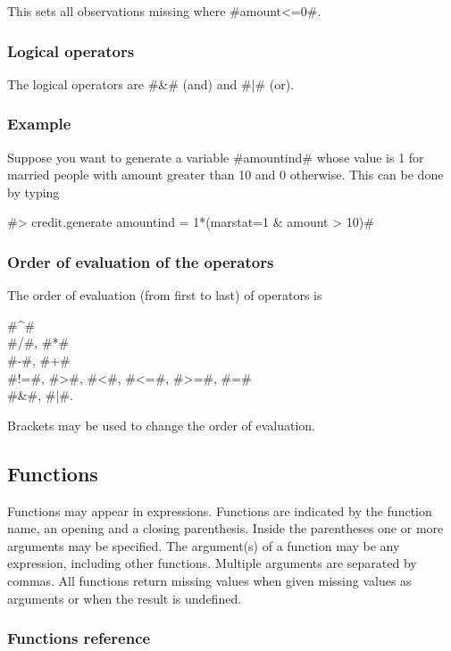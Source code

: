 This sets all observations missing where #amount<=0#.

\subsubsection{Logical operators}

The logical operators are #&# (and) and #|# (or).

\subsubsection*{Example}

Suppose you want to generate a variable #amountind# whose value is
1 for married people with
amount greater than 10 and 0 otherwise. This can be done by typing

#> credit.generate amountind = 1*(marstat=1 & amount > 10)#


\subsubsection{Order of evaluation of the operators}

The order of evaluation (from first to last) of operators is

#^# \\
#/#, #*#\\
#-#, #+#\\
#!=#, #>#, #<#, #<=#, #>=#, #=#\\
#&#, #|#.

Brackets may be used to change the order of evaluation.


\subsection{Functions}

Functions may appear in expressions. Functions are indicated by
the function name, an opening and a closing parenthesis. Inside
the parentheses one or more arguments may be specified. The
argument(s) of a function may be any expression, including other
functions. Multiple arguments are separated by commas. All
functions return missing values when given missing values as
arguments or when the result is undefined.

\subsubsection*{Functions reference}

